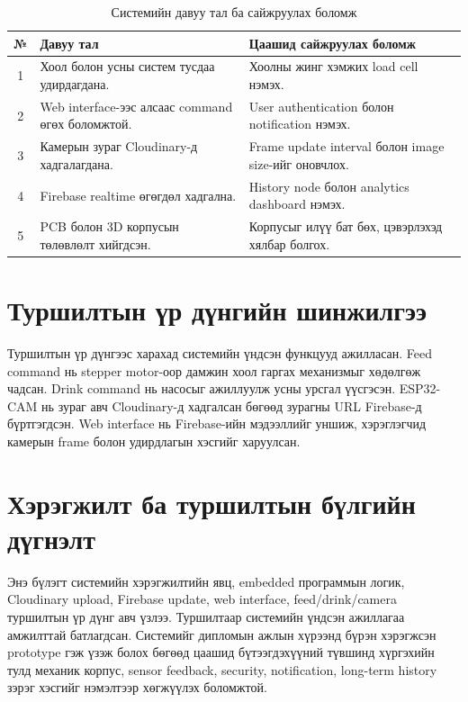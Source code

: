 \documentclass[12pt,a4paper]{report}
\begin{document}
\begin{table}[H]
\scriptsize
\centering
\caption{Системийн давуу тал ба сайжруулах боломж}
\begin{tabularx}{\textwidth}{|c|X|X|}
\hline
\textbf{№} & \textbf{Давуу тал} & \textbf{Цаашид сайжруулах боломж} \\ \hline
1 & Хоол болон усны систем тусдаа удирдагдана. & Хоолны жинг хэмжих load cell нэмэх. \\ \hline
2 & Web interface-ээс алсаас command өгөх боломжтой. & User authentication болон notification нэмэх. \\ \hline
3 & Камерын зураг Cloudinary-д хадгалагдана. & Frame update interval болон image size-ийг оновчлох. \\ \hline
4 & Firebase realtime өгөгдөл хадгална. & History node болон analytics dashboard нэмэх. \\ \hline
5 & PCB болон 3D корпусын төлөвлөлт хийгдсэн. & Корпусыг илүү бат бөх, цэвэрлэхэд хялбар болгох. \\ \hline
\end{tabularx}
\end{table}

\section{Туршилтын үр дүнгийн шинжилгээ}

Туршилтын үр дүнгээс харахад системийн үндсэн функцууд ажилласан. Feed command нь stepper motor-оор дамжин хоол гаргах механизмыг хөдөлгөж чадсан. Drink command нь насосыг ажиллуулж усны урсгал үүсгэсэн. ESP32-CAM нь зураг авч Cloudinary-д хадгалсан бөгөөд зурагны URL Firebase-д бүртгэгдсэн. Web interface нь Firebase-ийн мэдээллийг уншиж, хэрэглэгчид камерын frame болон удирдлагын хэсгийг харуулсан.

\section{Хэрэгжилт ба туршилтын бүлгийн дүгнэлт}

Энэ бүлэгт системийн хэрэгжилтийн явц, embedded программын логик, Cloudinary upload, Firebase update, web interface, feed/drink/camera туршилтын үр дүнг авч үзлээ. Туршилтаар системийн үндсэн ажиллагаа амжилттай батлагдсан. Системийг дипломын ажлын хүрээнд бүрэн хэрэгжсэн prototype гэж үзэж болох бөгөөд цаашид бүтээгдэхүүний түвшинд хүргэхийн тулд механик корпус, sensor feedback, security, notification, long-term history зэрэг хэсгийг нэмэлтээр хөгжүүлэх боломжтой.
\end{document}
